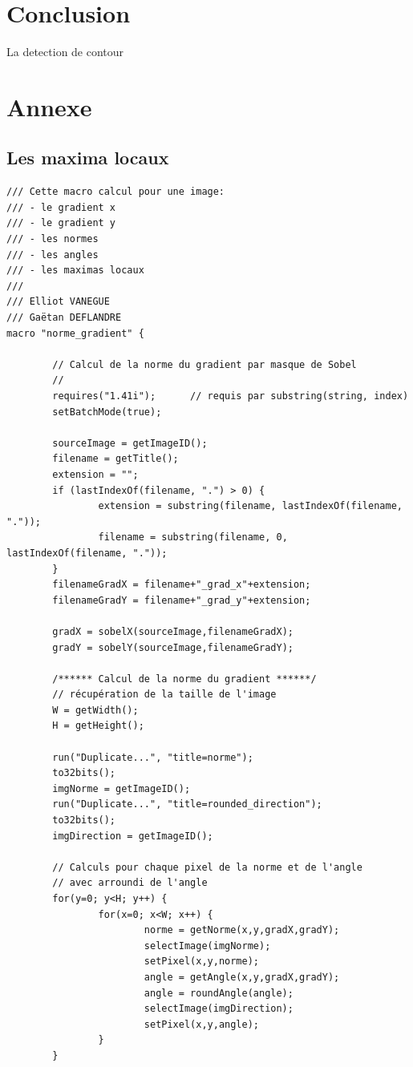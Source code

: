 \documentclass[a4paper,11pt]{article}
\begin{document}
  \section{Conclusion}
  La detection de contour 
  
  
  \newpage
  
  \section{Annexe}
  
  \subsection{Les maxima locaux}
  
  \begin{lstlisting}[caption=Macro de calcul des maxima locaux]
/// Cette macro calcul pour une image:
/// - le gradient x
/// - le gradient y
/// - les normes
/// - les angles
/// - les maximas locaux
///
/// Elliot VANEGUE
/// Gaëtan DEFLANDRE
macro "norme_gradient" {

        // Calcul de la norme du gradient par masque de Sobel
        //
        requires("1.41i");      // requis par substring(string, index)
        setBatchMode(true);

        sourceImage = getImageID();
        filename = getTitle();
        extension = "";
        if (lastIndexOf(filename, ".") > 0) {
                extension = substring(filename, lastIndexOf(filename, "."));
                filename = substring(filename, 0, lastIndexOf(filename, "."));
        }
        filenameGradX = filename+"_grad_x"+extension;
        filenameGradY = filename+"_grad_y"+extension;

        gradX = sobelX(sourceImage,filenameGradX);
        gradY = sobelY(sourceImage,filenameGradY);
        
        /****** Calcul de la norme du gradient ******/
        // récupération de la taille de l'image
        W = getWidth();
        H = getHeight();
        
        run("Duplicate...", "title=norme");
        to32bits();
        imgNorme = getImageID();
        run("Duplicate...", "title=rounded_direction");
        to32bits();
        imgDirection = getImageID();
        
        // Calculs pour chaque pixel de la norme et de l'angle
        // avec arroundi de l'angle
        for(y=0; y<H; y++) {
                for(x=0; x<W; x++) {
                        norme = getNorme(x,y,gradX,gradY);
                        selectImage(imgNorme);
                        setPixel(x,y,norme);
                        angle = getAngle(x,y,gradX,gradY);
                        angle = roundAngle(angle);
                        selectImage(imgDirection);
                        setPixel(x,y,angle);
                }
        }
        

\end{lstlisting}
\end{document}
